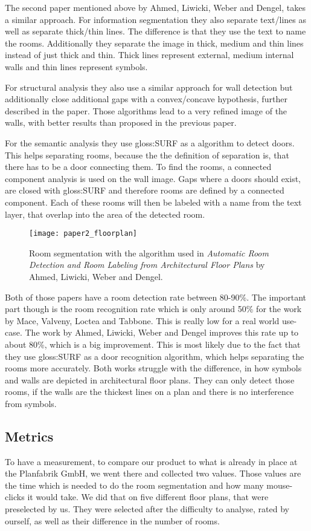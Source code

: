 The second paper mentioned above by Ahmed, Liwicki, Weber and Dengel, takes a similar approach. For information segmentation they also separate text/lines as well as separate thick/thin lines. The difference is that they use the text to name the rooms. Additionally they separate the image in thick, medium and thin lines instead of just thick and thin. Thick lines represent external, medium internal walls and thin lines represent symbols.

For structural analysis they also use a similar approach for wall detection but additionally close additional gaps with a convex/concave hypothesis, further described in the paper. Those algorithms lead to a very refined image of the walls, with better results than proposed in the previous paper.

For the semantic analysis they use \gls{gloss:SURF} as a algorithm to detect doors. This helps separating rooms, because the the definition of separation is, that there has to be a door connecting them. To find the rooms, a connected component analysis is used on the wall image. Gaps where a doors should exist, are closed with \gls{gloss:SURF} and therefore rooms are defined by a connected component. Each of these rooms will then be labeled with a name from the text layer, that overlap into the area of the detected room.

\begin{figure}[H]
	\centering
	\texttt{[image: paper2\_floorplan]}
	\caption{Room segmentation with the algorithm used in \textit{Automatic Room Detection and Room Labeling from Architectural Floor Plans} by Ahmed, Liwicki, Weber and Dengel. }
	\label{fig:paper2_floorplan}
\end{figure}

Both of those papers have a room detection rate between 80-90\%. The important part though is the room recognition rate which is only around 50\% for the work by Mace, Valveny, Loctea and Tabbone. This is really low for a real world use-case. The work by Ahmed, Liwicki, Weber and Dengel improves this rate up to about 80\%, which is a big improvement. This is most likely due to the fact that they use \gls{gloss:SURF} as a door recognition algorithm, which helps separating the rooms more accurately. Both works struggle with the difference, in how symbols and walls are depicted in architectural floor plans. They can only detect those rooms, if the walls are the thickest lines on a plan and there is no interference from symbols.
 

\subsection{Metrics}
To have a measurement, to compare our product to what is already in place at the Planfabrik GmbH, we went there and collected two values. Those values are the time which is needed to do the room segmentation and how many mouse-clicks it would take. We did that on five different floor plans, that were preselected by us. They were selected after the difficulty to analyse, rated by ourself, as well as their difference in the number of rooms.

